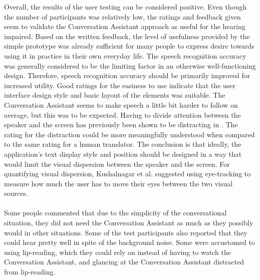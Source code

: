 \documentclass[english, 12pt, a4paper, pdftex, elec, utf8]{aaltothesis}
\begin{document}
Overall, the results of the user testing can be considered positive. Even though the number of participants was relatively low, the ratings and feedback given seem to validate the Conversation Assistant approach as useful for the hearing impaired. Based on the written feedback, the level of usefulness provided by the simple prototype was already sufficient for many people to express desire towards using it in practice in their own everyday life. The speech recognition accuracy was generally considered to be the limiting factor in an otherwise well-functioning design. Therefore, speech recognition accuracy should be primarily improved for increased utility. Good ratings for the easiness to use indicate that the user interface design style and basic layout of the elements was suitable. The Conversation Assistant seems to make speech a little bit harder to follow on average, but this was to be expected. Having to divide attention between the speaker and the screen has previously been shown to be distracting in \cite{kushalnagar2015tracked}. The rating for the distraction could be more meaningfully understood when compared to the same rating for a human translator. The conclusion is that ideally, the application's text display style and position should be designed in a way that would limit the visual dispersion between the speaker and the screen. For quantifying visual dispersion, Kushalnagar et al. suggested using eye-tracking to measure how much the user has to move their eyes between the two visual sources. \\\\ Some people commented that due to the simplicity of the conversational situation, they did not need the Conversation Assistant as much as they possibly would in other situations. Some of the test participants also reported that they could hear pretty well in spite of the background noise. Some were accustomed to using lip-reading, which they could rely on instead of having to watch the Conversation Assistant, and glancing at the Conversation Assistant distracted from lip-reading. \\\\
\end{document}
